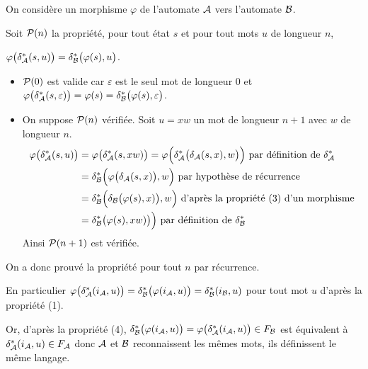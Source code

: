 \begin{Exercise}[label=ques:delta]
On considère un morphisme $\varphi$ de l'automate ${\cal A}$ vers l'automate ${\cal B}$.

Soit ${\cal P}(n)$ la propriété, pour tout état $s$ et pour tout mots $u$ de longueur $n$, 

$\varphi\bigl(\delta_{\cal A}^*(s, u)\bigr) = \delta_{\cal B}^*\bigl(\varphi(s), u\bigr)$.

\begin{itemize}
  \item ${\cal P}(0)$ est valide car $\varepsilon$ est le seul mot de longueur 0 et
  $\varphi\bigl(\delta_{\cal A}^*(s, \varepsilon)\bigr) = \varphi(s) = \delta_{\cal B}^*\bigl(\varphi(s), \varepsilon\bigr)$.
  \item On suppose ${\cal P}(n)$ vérifiée. Soit $u = xw$ un mot de longueur $n+1$ avec $w$ de longueur $n$.
\begin{align*}
\varphi\bigl(\delta_{\cal A}^*(s, u)\bigr) 
&
= \varphi\bigl(\delta_{\cal A}^*(s, xw)\bigr)
= \varphi\Bigl(\delta_{\cal A}^*\bigl(\delta_{\cal A}(s, x), w\bigr)\Bigr)
\hbox{ par définition de }\delta_{\cal A}^*
\\&
=\delta_{\cal B}^*\Bigl(\varphi\bigl(\delta_{\cal A}(s, x)\bigr), w\Bigr)
\hbox{ par hypothèse de récurrence}
\\&
=\delta_{\cal B}^*\Bigl(\delta_{\cal B}\bigl(\varphi(s), x)\bigr), w\Bigr)
\hbox{ d'après la propriété (3) d'un morphisme}
\\&
=\delta_{\cal B}^*\bigl(\varphi(s), xw)\bigr)\Bigr)
\hbox{ par définition de }\delta_{\cal B}^*
\end{align*}
Ainsi ${\cal P}(n+1)$ est vérifiée.
\end{itemize}
On a donc prouvé la propriété pour tout $n$ par récurrence.

\smallskip
En particulier $\varphi\bigl(\delta_{\cal A}^*(i_{\cal A}, u)\bigr) = \delta_{\cal B}^*\bigl(\varphi(i_{\cal A}, u)\bigr)
= \delta_{\cal B}^*(i_{\cal B}, u)$ pour tout mot $u$ d'après la propriété (1).

Or, d'après la propriété (4), $\delta_{\cal B}^*\bigl(\varphi(i_{\cal A}, u)\bigr) = \varphi\bigl(\delta_{\cal A}^*(i_{\cal A}, u)\bigr)\in F_{\cal B}$ est équivalent à $\delta_{\cal A}^*(i_{\cal A}, u)\in F_{\cal A}$ donc $\cal A$ et $\cal B$ reconnaissent les mêmes mots, ils définissent le même langage.
\end{Exercise}
